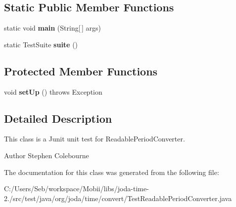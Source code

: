 \subsection*{Static Public Member Functions}
\begin{DoxyCompactItemize}
\item 
\hypertarget{classorg_1_1joda_1_1time_1_1convert_1_1_test_readable_period_converter_a419df8f4cf241c1d2eee01eb600d5c8f}{static void {\bfseries main} (String\mbox{[}$\,$\mbox{]} args)}\label{classorg_1_1joda_1_1time_1_1convert_1_1_test_readable_period_converter_a419df8f4cf241c1d2eee01eb600d5c8f}

\item 
\hypertarget{classorg_1_1joda_1_1time_1_1convert_1_1_test_readable_period_converter_a2a0cc1c592fb4312034197fa14d28214}{static Test\-Suite {\bfseries suite} ()}\label{classorg_1_1joda_1_1time_1_1convert_1_1_test_readable_period_converter_a2a0cc1c592fb4312034197fa14d28214}

\end{DoxyCompactItemize}
\subsection*{Protected Member Functions}
\begin{DoxyCompactItemize}
\item 
\hypertarget{classorg_1_1joda_1_1time_1_1convert_1_1_test_readable_period_converter_a87706589365c27b91c22310346769a98}{void {\bfseries set\-Up} ()  throws Exception }\label{classorg_1_1joda_1_1time_1_1convert_1_1_test_readable_period_converter_a87706589365c27b91c22310346769a98}

\end{DoxyCompactItemize}


\subsection{Detailed Description}
This class is a Junit unit test for Readable\-Period\-Converter.

\begin{DoxyAuthor}{Author}
Stephen Colebourne 
\end{DoxyAuthor}


The documentation for this class was generated from the following file\-:\begin{DoxyCompactItemize}
\item 
C\-:/\-Users/\-Seb/workspace/\-Mobii/libs/joda-\/time-\/2./src/test/java/org/joda/time/convert/Test\-Readable\-Period\-Converter.\-java\end{DoxyCompactItemize}
